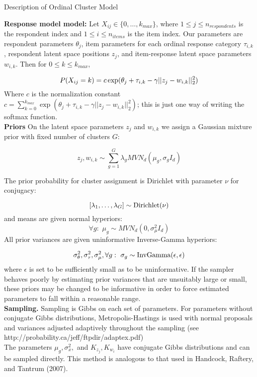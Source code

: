 \documentclass[12pt]{article}
\newcommand{\tx}[1]{\textnormal{#1}}
\begin{document}
	
	\begin{center}
		Description of Ordinal Cluster Model
	\end{center}
	
\textbf{Response model model:} Let $X_{ij}\in\{0,\dots,k_{max}\}$, where $1\leq j\leq n_{respondents}$ is the respondent index and $1\leq i\leq n_{items}$ is the item index. Our parameters are respondent parameters $\theta_j$, item parameters for each ordinal response category $\tau_{i,k}$, respondent latent space positions $z_j$, and item-response latent space parameters $w_{i,k}$.  Then for $0\leq k\leq k_{max}$,

$$P(X_{ij}=k)=c\,\tx{exp}(\theta_j+\tau_{i,k}-\gamma||{z}_j-w_{i,k}||_2^2)$$ Where $c$ is the normalization constant  $c=\sum_{k=0}^{k_{max}}\exp(\theta_j+\tau_{i,k}-\gamma||z_j-w_{i,k}||_2^2)$; this is just one way of writing the softmax function. \\


\textbf{Priors} On the latent space parameters $z_j$ and $w_{i,k}$ we assign a Gaussian mixture prior with fixed number of clusters $G$:

$$z_j,w_{i,k}\sim\sum_{g=1}^{G}\lambda_{g}MVN_d(\mu_{g},\sigma_{g}I_d)$$

The prior probability for cluster assignment is Dirichlet with parameter $\nu$ for conjugacy:

$$[\lambda_1,\dots,\lambda_G]\sim \tx{Dirichlet}(\nu)$$ and means are given normal hyperiors: $$\forall g:\,\,\mu_{g}\sim MVN_d(0,\sigma_\mu^2I_d)$$ All prior variances are given uninformative Inverse-Gamma hyperiors:\

 $$\sigma_\theta^2,\sigma_\tau^2,\sigma_\mu^2,\forall g:\,\,\sigma_{g} \sim\tx{InvGamma}(\epsilon,\epsilon)$$ where $\epsilon$ is set to be sufficiently small as to be uninformative. If the sampler behaves poorly by estimating prior variances that are unsuitably large or small, these priors may be changed to be informative in order to force estimated parameters to fall within a reasonable range.\\
 

\textbf{Sampling.} Sampling is Gibbs on each set of parameters. For parameters without conjugate Gibbs distributions, Metropolis-Hastings is used with normal proposals and variances adjusted adaptively throughout the sampling (see http://probability.ca/jeff/ftpdir/adaptex.pdf)\\


The parameters $\mu_g,\sigma_x^2,$ and $K_{z_j},K_{w_i}$ have conjugate Gibbs distributions and can be sampled directly. This method is analogous to that used in Handcock, Raftery, and Tantrum (2007).
    
\end{document}
